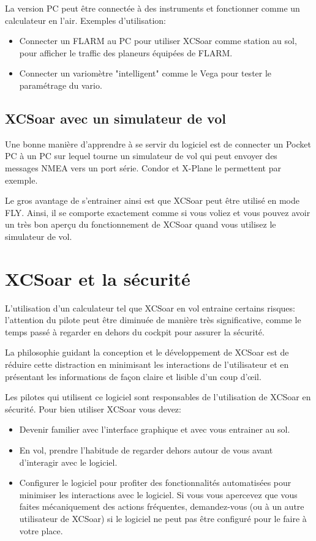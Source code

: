 La version PC peut être connectée à des instruments et fonctionner comme un calculateur en l'air. Exemples d'utilisation:

\begin{itemize}
\item Connecter un FLARM au PC pour utiliser XCSoar comme station au sol, pour afficher le traffic des planeurs équipées de FLARM.
\item Connecter un variomètre "intelligent"  comme le Vega pour tester le paramétrage du vario.
\end{itemize}

\subsection*{XCSoar avec un simulateur de vol}
Une bonne manière d'apprendre à se servir du logiciel est de connecter un Pocket PC à un PC sur lequel tourne un simulateur de vol qui peut envoyer des messages NMEA vers un port série. Condor et X-Plane le permettent par exemple.

Le gros avantage de s'entrainer ainsi est que XCSoar peut être utilisé en mode FLY. Ainsi, il se comporte exactement comme si vous voliez et vous pouvez avoir un très bon aperçu du fonctionnement de XCSoar quand vous utilisez le simulateur de vol. 

\section{XCSoar et la sécurité}
L'utilisation d'un calculateur tel que XCSoar en vol entraine certains risques: l'attention du pilote peut être diminuée de manière très significative, comme le temps passé à regarder en dehors du cockpit pour assurer la sécurité.

La philosophie guidant la conception et le développement de XCSoar est de réduire cette distraction en minimisant les interactions de l'utilisateur et en présentant les informations de façon claire et lisible d'un coup d'œil.

Les pilotes qui utilisent ce logiciel sont responsables de l'utilisation de XCSoar en sécurité. 
Pour bien utiliser XCSoar vous devez:
\begin{itemize}
\item Devenir familier avec l'interface graphique et avec vous entrainer au sol.
\item En vol, prendre l'habitude de regarder dehors autour de vous avant d'interagir avec le logiciel.
\item Configurer le logiciel pour profiter des fonctionnalités automatisées pour minimiser les interactions avec le logiciel. Si vous vous apercevez que vous faites mécaniquement des actions fréquentes, demandez-vous (ou à un autre utilisateur de XCSoar) si le logiciel ne peut pas être configuré pour le faire à votre place.
\end{itemize}
